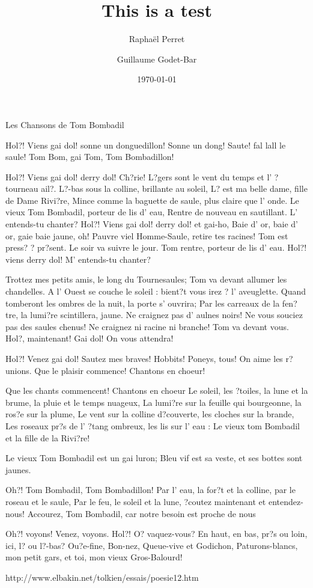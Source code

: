 \documentclass{rpg_scenario}
\title{This is a test}
\date{\today}
\begin{document}
\author{Rapha\"el Perret \and Guillaume Godet-Bar}
\maketitle

\begin{background}

Les Chansons de Tom Bombadil
	
Hol?! Viens gai dol! sonne un donguedillon!
Sonne un dong! Saute! fal lall le saule!
Tom Bom, gai Tom, Tom Bombadillon!

Hol?! Viens gai dol! derry dol! Ch?rie!
L?gers sont le vent du temps et l' ?tourneau ail?.
L?-bas sous la colline, brillante au soleil,
L? est ma belle dame, fille de Dame Rivi?re,
Mince comme la baguette de saule, plus claire que l' onde.
Le vieux Tom Bombadil, porteur de lis d' eau,
Rentre de nouveau en sautillant. L' entends-tu chanter?
Hol?! Viens gai dol! derry dol! et gai-ho,
Baie d' or, baie d' or, gaie baie jaune, oh!
Pauvre viel Homme-Saule, retire tes racines!
Tom est press? ? pr?sent. Le soir va suivre le jour.
Tom rentre, porteur de lis d' eau.
Hol?! viens derry dol! M' entends-tu chanter?

Trottez mes petits amis, le long du Tournesaules;
Tom va devant allumer les chandelles.
A l' Ouest se couche le soleil : bient?t vous irez ? l' aveuglette.
Quand tomberont les ombres de la nuit, la porte s' ouvrira;
Par les carreaux de la fen?tre, la lumi?re scintillera, jaune.
Ne craignez pas d' aulnes noirs! Ne vous souciez pas des saules chenus!
Ne craignez ni racine ni branche! Tom va devant vous.
Hol?, maintenant! Gai dol! On vous attendra!

Hol?! Venez gai dol! Sautez mes braves!
Hobbits! Poneys, tous! On aime les r?unions.
Que le plaisir commence! Chantons en choeur!

Que les chants commencent! Chantons en choeur
Le soleil, les ?toiles, la lune et la brume, la pluie et le temps nuageux,
La lumi?re sur la feuille qui bourgeonne, la ros?e sur la plume,
Le vent sur la colline d?couverte, les cloches sur la brande,
Les roseaux pr?s de l' ?tang ombreux, les lis sur l' eau :
Le vieux tom Bombadil et la fille de la Rivi?re!

Le vieux Tom Bombadil est un gai luron;
Bleu vif est sa veste, et ses bottes sont jaunes.

Oh?! Tom Bombadil, Tom Bombadillon!
Par l' eau, la for?t et la colline, par le roseau et le saule,
Par le feu, le soleil et la lune, ?coutez maintenant et entendez-nous!
Accourez, Tom Bombadil, car notre besoin est proche de nous


Oh?! voyons! Venez, voyons. Hol?! O? vaquez-vous?
En haut, en bas, pr?s ou loin, ici, l? ou l?-bas?
Ou?e-fine, Bon-nez, Queue-vive et Godichon,
Paturons-blancs, mon petit gars, et toi, mon vieux Gros-Balourd!

http://www.elbakin.net/tolkien/essais/poesie12.htm
\end{background}
\end{document}
